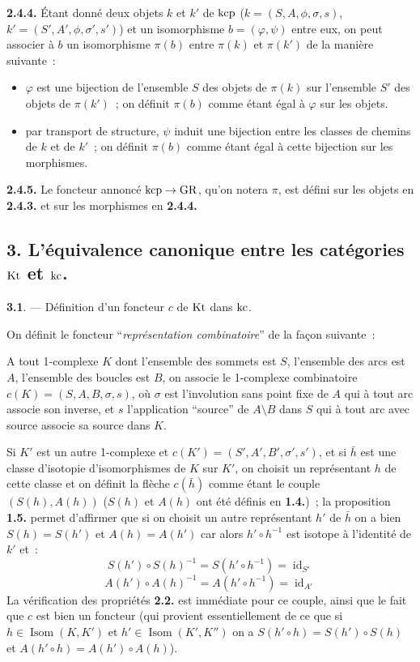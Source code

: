 {\bf 2.4.4.} Étant donné deux objets $k$ et $k'$ de $\operatorname{kcp}$ ($k = (S, A, \phi, \sigma, s)$, $k' = (S', A', \phi, \sigma', s')$) et un isomorphisme $b = (\varphi, \psi)$ entre eux, on peut associer à $b$ un isomorphisme $\pi(b)$ entre $\pi(k)$ et $\pi(k')$ de la manière suivante~:
\begin{itemize}
    \item[a)] $\varphi$ est une bijection de l'ensemble $S$ des objets de $\pi(k)$ sur l'ensemble $S'$ des objets de $\pi(k')$~; on définit $\pi(b)$ comme étant égal à $\varphi$ sur les objets.
    \item[b)] par transport de structure, $\psi$ induit une bijection entre les classes de chemins de $k$ et de $k'$~; on définit $\pi(b)$ comme étant égal à cette bijection sur les morphismes.
\end{itemize}

{\bf 2.4.5.} Le foncteur annoncé $\operatorname{kcp} \to \operatorname{GR}$, qu'on notera $\pi$, est défini sur les objets en {\bf 2.4.3.} et sur les morphismes en {\bf 2.4.4.}

\subsection*{3. L'équivalence canonique entre les catégories $\operatorname{Kt}$ et $\operatorname{kc}$.}

{\bf 3.1}. --- Définition d'un foncteur $c$ de $\operatorname{Kt}$ dans $\operatorname{kc}$.

On définit le foncteur ``\emph{représentation combinatoire}'' de la fa\c{c}on suivante~:

A tout 1-complexe $K$ dont l'ensemble des sommets est $S$, l'ensemble des arcs est $A$, l'ensemble des boucles est $B$, on associe le 1-complexe combinatoire $c(K) = (S, A, B, \sigma, s)$, où $\sigma$ est l'involution sans point fixe de $A$ qui à tout arc associe son inverse, et $s$ l'application ``source'' de $A \setminus B$ dans $S$ qui à tout arc avec source associe sa source dans $K$.

Si $K'$ est un autre 1-complexe et $c(K') = (S', A', B', \sigma', s')$, et si $\bar{h}$ est une classe d'isotopie d'isomorphismes de $K$ sur $K'$, on choisit un représentant $h$ de cette classe et on définit la flèche $c(\bar{h})$ comme étant le couple $(S(h),A(h))$ ($S(h)$ et $A(h)$ ont été définis en {\bf 1.4.})~; la proposition {\bf 1.5.} permet d'affirmer que si on choisit un autre représentant $h'$ de $\bar{h}$ on a bien $S(h) = S(h')$ et $A(h) = A(h')$ car alors $h' \circ h^{-1}$ est isotope à l'identité de $k'$ et~:
$$
S(h') \circ S(h)^{-1} = S(h' \circ h^{-1}) = \operatorname{id}_{S'}
$$
$$
A(h') \circ A(h)^{-1} = A(h' \circ h^{-1}) = \operatorname{id}_{A'}
$$
La vérification des propriétés {\bf 2.2.} est immédiate pour ce couple, ainsi que le fait que $c$ est bien un foncteur (qui provient essentiellement de ce que si $h \in \operatorname{Isom}(K,K')$ et $h' \in \operatorname{Isom}(K',K'')$ on a $S(h' \circ h) = S(h') \circ S(h)$ et $A(h' \circ h) = A(h') \circ A(h)$).

